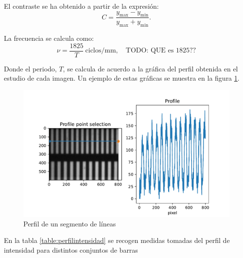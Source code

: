\documentclass{./packages/optica-article}
\begin{document}
El contraste se ha obtenido a partir de la expresión:
\nopagebreak
\begin{equation}
	C = \frac{y_{\max} - y_{\min}}{y_{\max} + y_{\min}}.
	\label{eq:contraste}
\end{equation}

La frecuencia se calcula como:
\nopagebreak
\begin{equation}
	\nu = \frac{1825}{T}\ \textrm{ciclos/mm},\quad\textrm{TODO: QUE es 1825??}\label{eq:frecuencia}
\end{equation}

Donde el periodo, $T$, se calcula de acuerdo a la gráfica del perfil obtenida en el estudio de cada imagen. Un ejemplo de estas gráficas se muestra en la figura \ref{fig:perfil:example}.

\begin{figure}[!h]
	\includegraphics[width=\textwidth]{profile-lines.pdf}
	\caption{Perfil de un segmento de líneas}\label{fig:perfil:example}
\end{figure}


En la tabla \ref{table:perfilintensidad} se recogen medidas tomadas del perfil de intensidad para distintos conjuntos de barras

\begin{table}[hbp]
	\centering
	\caption{Datos del perfil de intensidad. $y$: intensidad. $x$. El contraste se ha obtenido a partir de la ecuación~\ref{eq:contraste}. La frecuencia se ha obtenido a través de la ecuación~\ref{eq:frecuencia}. Como se obtienen los periodos se explica visualmente en la Fig.~\ref{fig:perfil:example}}%
	\label{table:perfilintensidad}
\end{table}
\end{document}
